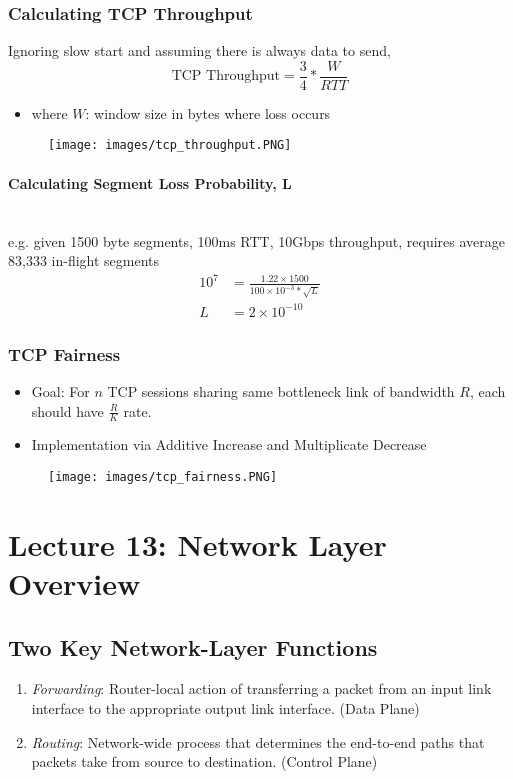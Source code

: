 \documentclass[a4paper]{article}
\begin{document}
\subsubsection{Calculating TCP Throughput}
Ignoring slow start and assuming there is always data to send,
$$\text{TCP Throughput} = \frac{3}{4}*\frac{W}{RTT}$$
\begin{itemize}
    \item where $W$: window size in bytes where loss occurs
\end{itemize}
\begin{figure}[H]
    \centering
    \texttt{[image: images/tcp\_throughput.PNG]}
\end{figure}

\paragraph{Calculating Segment Loss Probability, L}\mbox{}\\
e.g. given 1500 byte segments, 100ms RTT, 10Gbps throughput, requires average 83,333 in-flight segments
\begin{align*}
    10^7 &=  \frac{1.22\times1500}{100\times10^{-3}*\sqrt{L}}\\
    L &= 2\times 10^{-10}
\end{align*}

\newpage
\subsubsection{TCP Fairness}
\begin{itemize}
    \item Goal: For $n$ TCP sessions sharing same bottleneck link of bandwidth $R$, each should have $\displaystyle\frac{R}{K}$ rate.
    \item Implementation via Additive Increase and Multiplicate Decrease
\end{itemize}
\begin{figure}[H]
    \centering
    \texttt{[image: images/tcp\_fairness.PNG]}
\end{figure}

\newpage
\section{Lecture 13: Network Layer Overview}
\subsection{Two Key Network-Layer Functions}
\begin{enumerate}
    \item \textit{Forwarding}: Router-local action of transferring a packet from an input link interface to the appropriate output link interface. (Data Plane)
    \item \textit{Routing}: Network-wide process that determines the end-to-end paths that packets take from source to destination. (Control Plane)
\end{enumerate}
\end{document}
